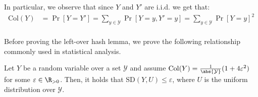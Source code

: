 \documentclass[a4paper, 12pt]{report}
\begin{document}
    In particular, we observe that since $Y$ and $Y'$ are i.i.d. we get that:
    \[\begin{split}
        \mathrm{Col}(Y) &= \Pr[Y = Y'] = \sum_{y \in \mathcal{Y}} \Pr[Y = y, Y' = y] = \sum_{y \in \mathcal{Y}} \Pr[Y = y]^2 \\
    \end{split}\]
    
    Before proving the left-over hash lemma, we prove the following relationship commonly used in statistical analysis.

    \begin{framedprop}{}
        Let $Y$ be a random variable over a set $\mathcal{Y}$ and assume $\mathrm{Col}(Y) = \frac{1}{\abs{\mathcal{Y}}}(1+4\varepsilon^2)$ for some $\varepsilon \in \R_{> 0}$. Then, it holds that $\mathrm{SD}(Y, U) \leq \varepsilon$, where $U$ is the uniform distribution over $\mathcal{Y}$.
    \end{framedprop}
\end{document}
